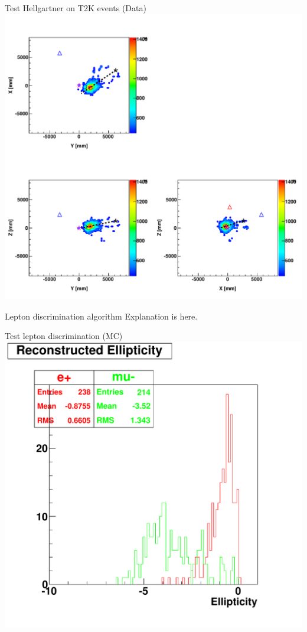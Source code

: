 \documentclass[14pt]{beamer}
\begin{document}
\begin{frame}{Test Hellgartner on T2K events (Data)}
	\centering
	\includegraphics[width=0.8\linewidth]{fom_map__run11331_evt29962767.pdf}
\end{frame}

\begin{frame}{Lepton discrimination algorithm}
	Explanation is here.
\end{frame}

\begin{frame}{Test lepton discrimination (MC)}
	\centering
	\includegraphics[width=0.8\linewidth]{emu_mtq_recon_ellipticity-3Mcut.pdf}
\end{frame}
\end{document}
